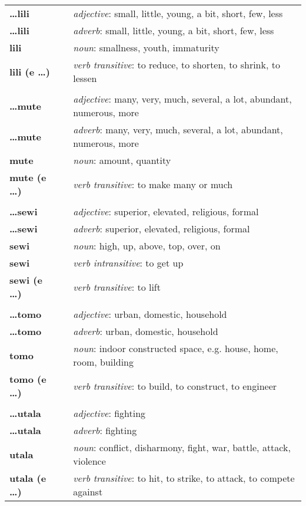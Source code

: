 \begin{supertabular}{p{2,5cm}|ll}
\textbf{\dots lili} && \textit{adjective}: small, little, young, a bit, short, few, less \\ %
\textbf{\dots lili} && \textit{adverb}: small, little, young, a bit, short, few, less \\ %
\textbf{lili} && \textit{noun}: smallness, youth, immaturity \\ %
\textbf{lili (e \dots)} && \textit{verb transitive}: to reduce, to shorten, to shrink, to lessen \\ %
 && \\ %
%
\textbf{\dots mute} && \textit{adjective}: many, very, much, several, a lot, abundant, numerous, more \\ %
\textbf{\dots mute} && \textit{adverb}: many, very, much, several, a lot, abundant, numerous, more \\ %
\textbf{mute} && \textit{noun}: amount, quantity \\ %
\textbf{mute (e \dots)} && \textit{verb transitive}: to make many or much \\ %
 && \\ %
%
\textbf{\dots sewi} && \textit{adjective}: superior, elevated, religious, formal \\ %
\textbf{\dots sewi} && \textit{adverb}: superior, elevated, religious, formal \\ %
\textbf{sewi} && \textit{noun}: high, up, above, top, over, on \\ %
\textbf{sewi} && \textit{verb intransitive}: to get up \\ %
\textbf{sewi (e \dots)} && \textit{verb transitive}: to lift \\ %
 && \\ %
%
\textbf{\dots tomo} && \textit{adjective}: urban, domestic, household \\ %
\textbf{\dots tomo} && \textit{adverb}: urban, domestic, household \\ %
\textbf{tomo} && \textit{noun}: indoor constructed space, e.g. house, home, room, building \\ %
\textbf{tomo (e \dots)} && \textit{verb transitive}: to build, to construct, to engineer \\ %
 && \\ %
%
\textbf{\dots utala} && \textit{adjective}: fighting \\ %
\textbf{\dots utala} && \textit{adverb}: fighting \\ %
\textbf{utala} && \textit{noun}: conflict, disharmony, fight, war, battle, attack, violence \\ %
\textbf{utala (e \dots)} && \textit{verb transitive}: to hit, to strike, to attack, to compete against \\ %
\end{supertabular} \\
% 

